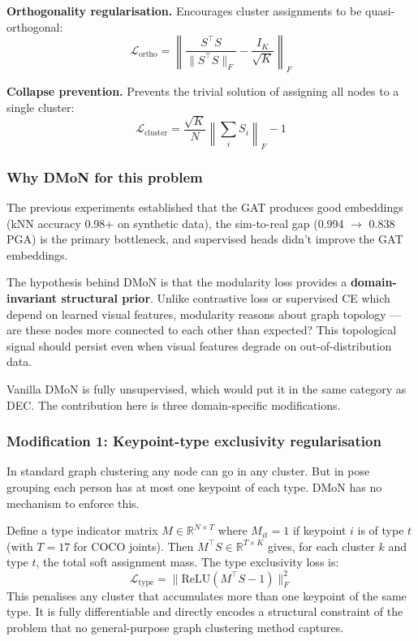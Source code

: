 \textbf{Orthogonality regularisation.} Encourages cluster assignments to be quasi-orthogonal:
\begin{equation}
\mathcal{L}_{\text{ortho}} = \left\| \frac{S^\top S}{\|S^\top S\|_F} - \frac{I_K}{\sqrt{K}} \right\|_F
\end{equation}

\textbf{Collapse prevention.} Prevents the trivial solution of assigning all nodes to a single cluster:
\begin{equation}
\mathcal{L}_{\text{cluster}} = \frac{\sqrt{K}}{N} \left\| \sum_i S_i \right\|_F - 1
\end{equation}


\subsubsection{Why DMoN for this problem}

The previous experiments established that the GAT produces good embeddings (kNN accuracy 0.98+ on synthetic data), the sim-to-real gap (0.994 $\to$ 0.838 PGA) is the primary bottleneck, and supervised heads didn't improve the GAT embeddings.

The hypothesis behind DMoN is that the modularity loss provides a \textbf{domain-invariant structural prior}. Unlike contrastive loss or supervised CE which depend on learned visual features, modularity reasons about graph topology --- are these nodes more connected to each other than expected? This topological signal should persist even when visual features degrade on out-of-distribution data.

Vanilla DMoN is fully unsupervised, which would put it in the same category as DEC. The contribution here is three domain-specific modifications.


\subsubsection{Modification 1: Keypoint-type exclusivity regularisation}

In standard graph clustering any node can go in any cluster. But in pose grouping each person has at most one keypoint of each type. DMoN has no mechanism to enforce this.

Define a type indicator matrix $M \in \mathbb{R}^{N \times T}$ where $M_{it} = 1$ if keypoint $i$ is of type $t$ (with $T = 17$ for COCO joints). Then $M^\top S \in \mathbb{R}^{T \times K}$ gives, for each cluster $k$ and type $t$, the total soft assignment mass. The type exclusivity loss is:
\begin{equation}
\mathcal{L}_{\text{type}} = \| \text{ReLU}(M^\top S - 1) \|_F^2
\end{equation}
This penalises any cluster that accumulates more than one keypoint of the same type. It is fully differentiable and directly encodes a structural constraint of the problem that no general-purpose graph clustering method captures.


